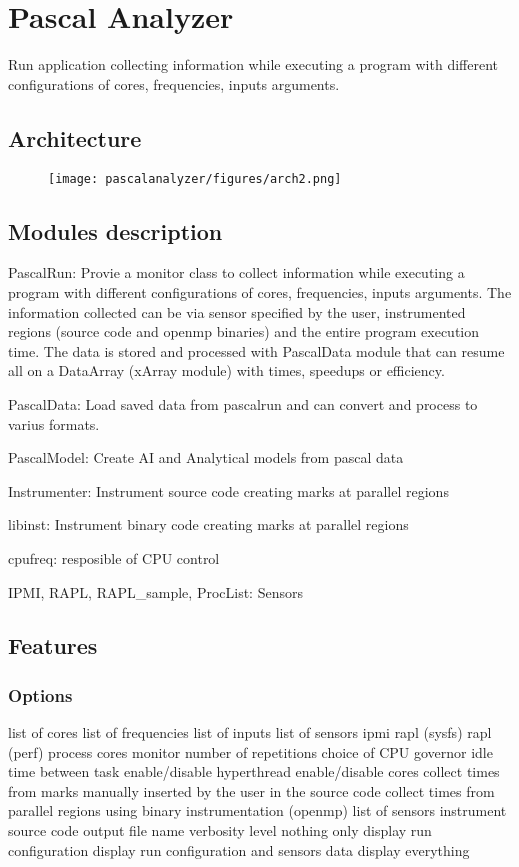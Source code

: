 \section{Pascal Analyzer}

Run application collecting information while executing a program with
different configurations of cores, frequencies, inputs arguments.

\subsection{Architecture}
\begin{figure}
	\texttt{[image: pascalanalyzer/figures/arch2.png]}
\end{figure}
\subsection{Modules description}
PascalRun: Provie a monitor class to collect information while executing  a program 
with different configurations of cores, frequencies, inputs arguments. The information collected can be via sensor specified by the user,  instrumented regions (source code and openmp binaries) and the entire  program execution time. The data is stored and processed with PascalData  module that can resume all on a DataArray (xArray module) with times, speedups or efficiency.

PascalData: Load saved data from pascalrun and can convert and process to varius formats.

PascalModel: Create AI and Analytical models from pascal data

Instrumenter: Instrument source code creating marks at parallel regions

libinst: Instrument binary code creating marks at parallel regions

cpufreq: resposible of CPU control

IPMI, RAPL, RAPL\_sample, ProcList: Sensors

\subsection{Features}

\subsubsection{Options}
\begin{outline}
	\1 list of cores
	\1 list of frequencies
	\1 list of inputs
	\1 list of sensors
		\2 ipmi
		\2 rapl (sysfs)
		\2 rapl (perf)
		\2 process cores monitor
	\1 number of repetitions
	\1 choice of CPU governor
	\1 idle time between task
	\1 enable/disable hyperthread
	\1 enable/disable cores
	\1 collect times from marks manually inserted by the user in the source code
	\1 collect times from parallel regions using binary instrumentation (openmp)
	\1 list of sensors
	\1 instrument source code
	\1 output file name
	\1 verbosity level
		 nothing
		 only display run configuration
		 display run configuration and sensors data
		 display everything
\end{outline}

